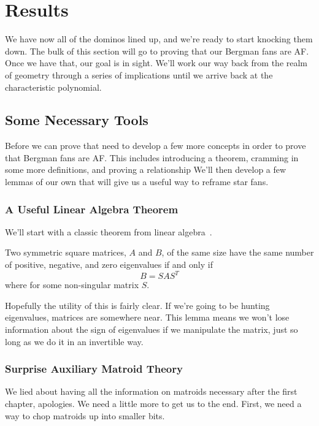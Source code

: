 \documentclass[12pt,oneside]{../../sfsuthesis}
\begin{document}
\chapter{Results}

We have now all of the dominos lined up, and we're ready to start knocking them down.
The bulk of this section will go to proving that our Bergman fans are AF.
Once we have that, our goal is in sight.
We'll work our way back from the realm of geometry through a series of implications until we arrive back at the characteristic polynomial.

\section{Some Necessary Tools}

Before we can prove that need to develop a few more concepts in order to prove that Bergman fans are AF.
This includes introducing a theorem, cramming in some more definitions, and proving a relationship
We'll then develop a few lemmas of our own that will give us a useful way to reframe star fans.

\subsection{A Useful Linear Algebra Theorem}

We'll start with a classic theorem from linear algebra~\cite{sylvesterXIXDemonstrationTheorem1852}.

\begin{proposition}\th\label{thm:sylvester}
    Two symmetric square matrices, \( A \) and \( B \), of the same size have the same number of positive, negative, and zero eigenvalues if and only if
    \[
        B = SAS^{T}
    \]
    where for some non-singular matrix \( S \).
\end{proposition}

Hopefully the utility of this is fairly clear.
If we're going to be hunting eigenvalues, matrices are somewhere near.
This lemma means we won't lose information about the sign of eigenvalues if we manipulate the matrix, just so long as we do it in an invertible way.

\subsection{Surprise Auxiliary Matroid Theory}

We lied about having all the information on matroids necessary after the first chapter, apologies.
We need a little more to get us to the end.
First, we need a way to chop matroids up into smaller bits.
\end{document}
